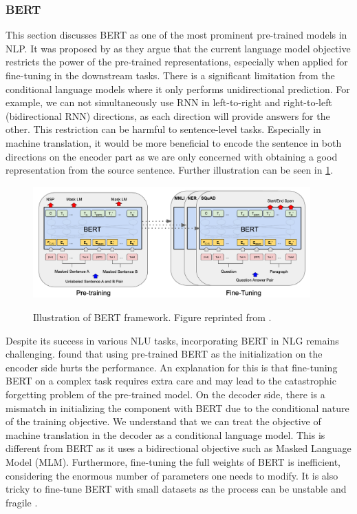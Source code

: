 \subsubsection{BERT}
This section discusses BERT as one of the most prominent pre-trained models in NLP. It was proposed by  as they argue that the current language model objective restricts the power of the pre-trained representations, especially when applied for fine-tuning in the downstream tasks. There is a significant limitation from the conditional language models where it only performs unidirectional prediction. For example, we can not simultaneously use RNN in left-to-right and right-to-left (bidirectional RNN) directions, as each direction will provide answers for the other. This restriction can be harmful to sentence-level tasks. Especially in machine translation, it would be more beneficial to encode the sentence in both directions on the encoder part as we are only concerned with obtaining a good representation from the source sentence. Further illustration can be seen in \cref{img:bert}.

\begin{figure}[h]
    {\includegraphics[width=0.95\textwidth]{img/bert.png}}
    \centering
    \caption{Illustration of BERT framework. Figure reprinted from .}
    \label{img:bert}
\end{figure}

Despite its success in various NLU tasks, incorporating BERT in NLG remains challenging.  found that using pre-trained BERT as the initialization on the encoder side hurts the performance. An explanation for this is that fine-tuning BERT on a complex task requires extra care and may lead to the catastrophic forgetting problem  of the pre-trained model. On the decoder side, there is a mismatch in initializing the component with BERT due to the conditional nature of the training objective. We understand that we can treat the objective of machine translation in the decoder as a conditional language model. This is different from BERT as it uses a bidirectional objective such as Masked Language Model (MLM). Furthermore, fine-tuning the full weights of BERT is inefficient, considering the enormous number of parameters one needs to modify. It is also tricky to fine-tune BERT with small datasets as the process can be unstable and fragile .

